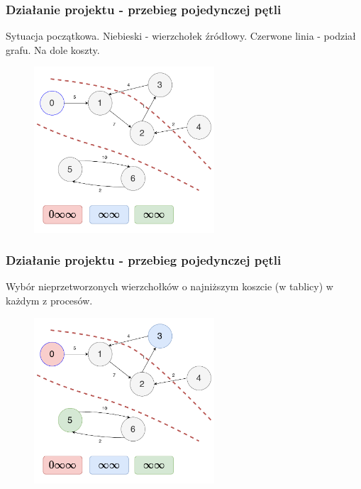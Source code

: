 \documentclass[10pt]{beamer}
\begin{document}
\begin{frame}
\frametitle{Działanie projektu - przebieg pojedynczej pętli}
Sytuacja początkowa. Niebieski - wierzchołek źródłowy. Czerwone linia - podział grafu. Na dole koszty.
\begin{figure}
\centering
\includegraphics[width=0.6\textwidth]{static/Algo0.pdf}
\end{figure}
\end{frame}

\begin{frame}
\frametitle{Działanie projektu - przebieg pojedynczej pętli}
Wybór nieprzetworzonych wierzchołków o najniższym koszcie (w tablicy) w każdym z procesów.
\begin{figure}
\centering
\includegraphics[width=0.6\textwidth]{static/Algo1.pdf}
\end{figure}
\end{frame}
\end{document}
